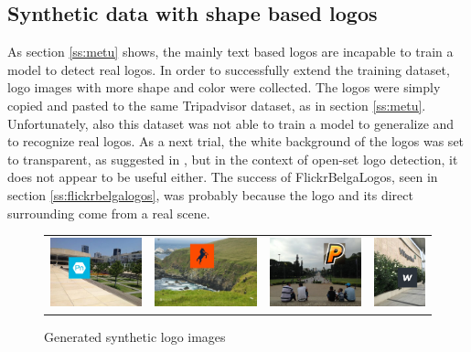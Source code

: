\subsection{Synthetic data with shape based logos}

As section \ref{ss:metu} shows, the mainly text based logos are incapable to train a model to detect real logos. In order to successfully extend the training dataset, logo images with more shape and color \cite{LogoClearbit} were collected. The logos were simply copied and pasted to the same Tripadvisor dataset, as in section \ref{ss:metu}. Unfortunately, also this dataset was not able to train a model to generalize and to recognize real logos. As a next trial, the white background of the logos was set to transparent, as suggested in \cite{DBLP:journals/corr/SuZG16}, but in the context of open-set logo detection, it does not appear to be useful either. The success of FlickrBelgaLogos, seen in section \ref{ss:flickrbelgalogos}, was probably because the logo and its direct surrounding come from a real scene.
\bigbreak
\begin{figure}
  \centering
\begin{tabular}{cccc}
  \includegraphics[height=20mm]{images/mt/clearbit1.jpg} &   \includegraphics[height=20mm]{images/mt/clearbit2.jpg}  & \includegraphics[height=20mm]{images/mt/clearbit3.jpg} &   \includegraphics[height=20mm]{images/mt/clearbit4.jpg}
\end{tabular}
\caption{Generated synthetic logo images}
\label{f:synlogo}
\end{figure}
\bigbreak

